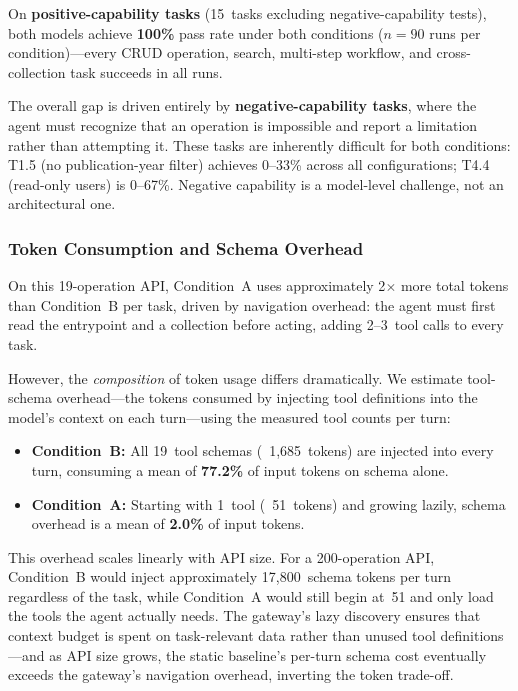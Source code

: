 \documentclass[11pt,a4paper]{article}
\begin{document}
On \textbf{positive-capability tasks} (15~tasks excluding negative-capability tests), both models achieve \textbf{100\%} pass rate under both conditions ($n{=}90$ runs per condition)---every CRUD operation, search, multi-step workflow, and cross-collection task succeeds in all runs.

The overall gap is driven entirely by \textbf{negative-capability tasks}, where the agent must recognize that an operation is impossible and report a limitation rather than attempting it. These tasks are inherently difficult for both conditions: T1.5 (no publication-year filter) achieves 0--33\% across all configurations; T4.4 (read-only users) is 0--67\%. Negative capability is a model-level challenge, not an architectural one.

\subsubsection{Token Consumption and Schema Overhead}

On this 19-operation API, Condition~A uses approximately 2$\times$ more total tokens than Condition~B per task, driven by navigation overhead: the agent must first read the entrypoint and a collection before acting, adding 2--3~tool calls to every task.

However, the \emph{composition} of token usage differs dramatically. We estimate tool-schema overhead---the tokens consumed by injecting tool definitions into the model's context on each turn---using the measured tool counts per turn:

\begin{itemize}
  \item \textbf{Condition~B:} All 19~tool schemas (~1,685~tokens) are injected into every turn, consuming a mean of \textbf{77.2\%} of input tokens on schema alone.
  \item \textbf{Condition~A:} Starting with 1~tool (~51~tokens) and growing lazily, schema overhead is a mean of \textbf{2.0\%} of input tokens.
\end{itemize}

This overhead scales linearly with API size. For a 200-operation API, Condition~B would inject approximately 17,800~schema tokens per turn regardless of the task, while Condition~A would still begin at~51 and only load the tools the agent actually needs. The gateway's lazy discovery ensures that context budget is spent on task-relevant data rather than unused tool definitions---and as API size grows, the static baseline's per-turn schema cost eventually exceeds the gateway's navigation overhead, inverting the token trade-off.
\end{document}

